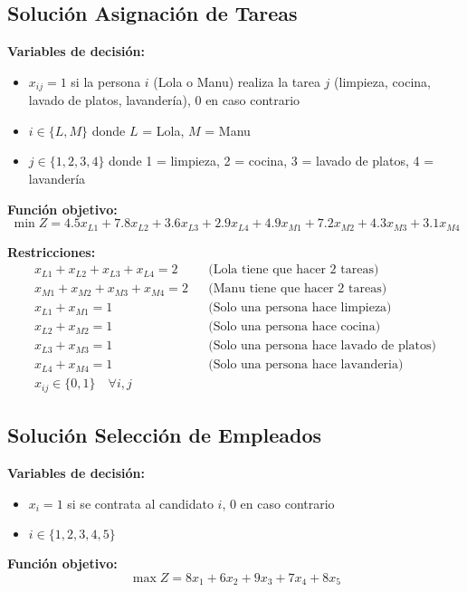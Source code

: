 \documentclass[12pt]{article}
\begin{document}
\subsection{Solución Asignación de Tareas}

\textbf{Variables de decisión:}
\begin{itemize}
    \item $x_{ij} = 1$ si la persona $i$ (Lola o Manu) realiza la tarea $j$ (limpieza, cocina, lavado de platos, lavandería), 0 en caso contrario
    \item $i \in \{L, M\}$ donde $L$ = Lola, $M$ = Manu
    \item $j \in \{1, 2, 3, 4\}$ donde 1 = limpieza, 2 = cocina, 3 = lavado de platos, 4 = lavandería
\end{itemize}

\textbf{Función objetivo:}
$$\min Z = 4.5x_{L1} + 7.8x_{L2} + 3.6x_{L3} + 2.9x_{L4} + 4.9x_{M1} + 7.2x_{M2} + 4.3x_{M3} + 3.1x_{M4}$$

\textbf{Restricciones:}
\begin{align*}
    x_{L1} + x_{L2} + x_{L3} + x_{L4} = 2 && \text{(Lola tiene que hacer 2 tareas)} \\
    x_{M1} + x_{M2} + x_{M3} + x_{M4} = 2 && \text{(Manu tiene que hacer 2 tareas)} \\
    x_{L1} + x_{M1} = 1 && \text{(Solo una persona hace limpieza)} \\
    x_{L2} + x_{M2} = 1 && \text{(Solo una persona hace cocina)} \\
    x_{L3} + x_{M3} = 1 && \text{(Solo una persona hace lavado de platos)} \\
    x_{L4} + x_{M4} = 1 && \text{(Solo una persona hace lavanderia)} \\
    x_{ij} \in \{0,1\} \quad \forall i,j
\end{align*}

\subsection{Solución Selección de Empleados}

\textbf{Variables de decisión:}
\begin{itemize}
    \item $x_i = 1$ si se contrata al candidato $i$, 0 en caso contrario
    \item $i \in \{1, 2, 3, 4, 5\}$
\end{itemize}

\textbf{Función objetivo:}
$$\max Z = 8x_1 + 6x_2 + 9x_3 + 7x_4 + 8x_5$$
\end{document}
